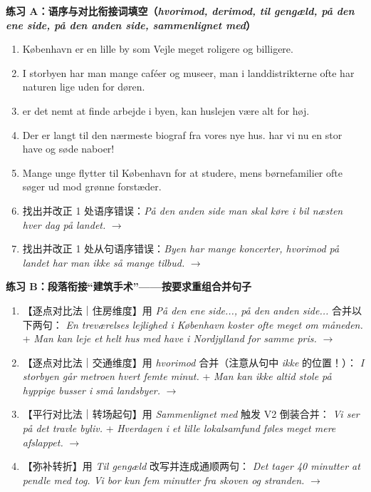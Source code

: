 \textbf{练习 A：语序与对比衔接词填空（\textit{hvorimod, derimod, til gengæld, på den ene side, på den anden side, sammenlignet med}）}
\begin{enumerate}
  \item \underline{\hspace{3.2cm}} København er en lille by som Vejle meget roligere og billigere.
  \item I storbyen har man mange caféer og museer, \underline{\hspace{2.4cm}} man i landdistrikterne ofte har naturen lige uden for døren.
  \item \underline{\hspace{2.8cm}} er det nemt at finde arbejde i byen, \underline{\hspace{2.8cm}} kan huslejen være alt for høj.
  \item Der er langt til den nærmeste biograf fra vores nye hus. \underline{\hspace{2.4cm}} har vi nu en stor have og søde naboer!
  \item Mange unge flytter til København for at studere, mens børnefamilier \underline{\hspace{2.0cm}} ofte søger ud mod grønne forstæder.
  \item 找出并改正 1 处语序错误：\textit{På den anden side man skal køre i bil næsten hver dag på landet.} $\rightarrow$
  \item 找出并改正 1 处从句语序错误：\textit{Byen har mange koncerter, hvorimod på landet har man ikke så mange tilbud.} $\rightarrow$
\end{enumerate}

\textbf{练习 B：段落衔接“建筑手术”——按要求重组合并句子}
\begin{enumerate}
  \item 【逐点对比法｜住房维度】用 \textit{På den ene side..., på den anden side...} 合并以下两句：\newline
        \textit{En treværelses lejlighed i København koster ofte meget om måneden.} + \textit{Man kan leje et helt hus med have i Nordjylland for samme pris.} $\rightarrow$
  \item 【逐点对比法｜交通维度】用 \textit{hvorimod} 合并（注意从句中 \textit{ikke} 的位置！）：\newline
        \textit{I storbyen går metroen hvert femte minut.} + \textit{Man kan ikke altid stole på hyppige busser i små landsbyer.} $\rightarrow$
  \item 【平行对比法｜转场起句】用 \textit{Sammenlignet med} 触发 V2 倒装合并：\newline
        \textit{Vi ser på det travle byliv.} + \textit{Hverdagen i et lille lokalsamfund føles meget mere afslappet.} $\rightarrow$
  \item 【弥补转折】用 \textit{Til gengæld} 改写并连成通顺两句：\newline
        \textit{Det tager 40 minutter at pendle med tog. Vi bor kun fem minutter fra skoven og stranden.} $\rightarrow$
\end{enumerate}

